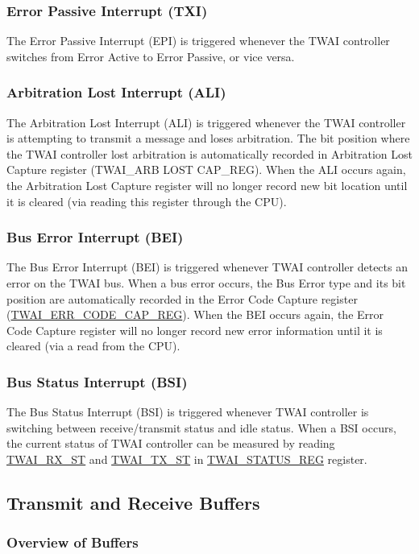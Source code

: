 \documentclass[main\_\_EN.tex]{subfiles}
\begin{document}
\subsubsection{Error Passive Interrupt (TXI)}
The Error Passive Interrupt (EPI) is triggered whenever the TWAI controller switches from Error Active to Error Passive, or vice versa.

\subsubsection{Arbitration Lost Interrupt (ALI)}
The Arbitration Lost Interrupt (ALI) is triggered whenever the TWAI controller is attempting to transmit a message and loses arbitration. The bit position where the TWAI controller lost arbitration is automatically recorded in Arbitration Lost Capture register (TWAI\_ARB LOST CAP\_REG). When the ALI occurs again, the Arbitration Lost Capture register will no longer record new bit location until it is cleared (via reading this register through the CPU).

\subsubsection{Bus Error Interrupt (BEI)}
The Bus Error Interrupt (BEI) is triggered whenever TWAI controller detects an error on the TWAI bus. When a bus error occurs, the Bus Error type and its bit position are automatically recorded in the Error Code Capture register (\hyperref[regdesc:TWAIERRCODECAPREG]{TWAI\_ERR\_CODE\_CAP\_REG}). When the BEI occurs again, the Error Code Capture register will no longer record new error information until it is cleared (via a read from the CPU).

\subsubsection{Bus Status Interrupt (BSI)}
The Bus Status Interrupt (BSI) is triggered whenever TWAI controller is switching between receive/transmit status and idle status. When a BSI occurs, the current status of TWAI controller can be measured by reading \hyperref[fielddesc:TWAIRXST]{TWAI\_RX\_ST} and \hyperref[fielddesc:TWAITXST]{TWAI\_TX\_ST} in \hyperref[regdesc:TWAISTATUSREG]{TWAI\_STATUS\_REG} register.

\subsection{Transmit and Receive Buffers}
\subsubsection{Overview of Buffers}
\end{document}
